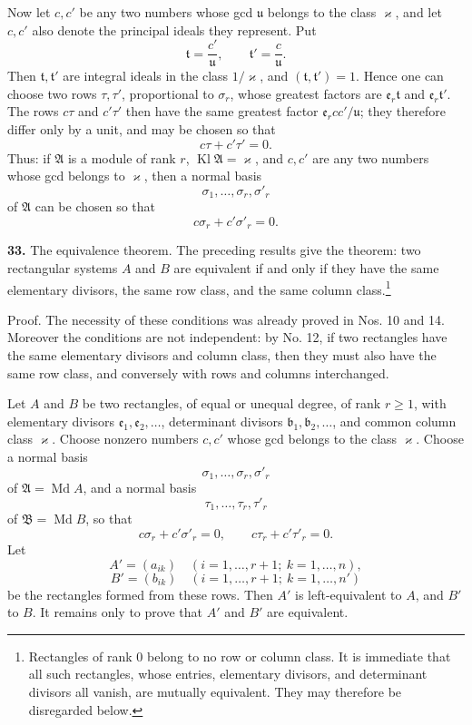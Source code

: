 \documentclass[11pt,a4paper]{article}
\newcommand{\Kl}{\operatorname{Kl}}
\begin{document}
Now let \(c,c'\) be any two numbers whose gcd \(\mathfrak u\) belongs to the class \(\varkappa\), and let \(c,c'\) also denote the principal ideals they represent. Put
\[
 \mathfrak t=\frac{c'}{\mathfrak u},\qquad
 \mathfrak t'=\frac{c}{\mathfrak u}.
\]
Then \(\mathfrak t,\mathfrak t'\) are integral ideals in the class \(1/\varkappa\), and \((\mathfrak t,\mathfrak t')=1\). Hence one can choose two rows \(\tau,\tau'\), proportional to \(\sigma_r\), whose greatest factors are \(\mathfrak e_r\mathfrak t\) and \(\mathfrak e_r\mathfrak t'\). The rows \(c\tau\) and \(c'\tau'\) then have the same greatest factor \(\mathfrak e_r cc'/\mathfrak u\); they therefore differ only by a unit, and may be chosen so that
\[
 c\tau+c'\tau'=0.
\]
Thus: if \(\mathfrak A\) is a module of rank \(r\), \(\Kl\mathfrak A=\varkappa\), and \(c,c'\) are any two numbers whose gcd belongs to \(\varkappa\), then a normal basis
\[
 \sigma_1,\ldots,\sigma_r,\sigma'_r
\]
of \(\mathfrak A\) can be chosen so that
\[
 c\sigma_r+c'\sigma'_r=0.
\]

\textbf{33.} The equivalence theorem. The preceding results give the theorem: two rectangular systems \(A\) and \(B\) are equivalent if and only if they have the same elementary divisors, the same row class, and the same column class.\footnote{Rectangles of rank \(0\) belong to no row or column class. It is immediate that all such rectangles, whose entries, elementary divisors, and determinant divisors all vanish, are mutually equivalent. They may therefore be disregarded below.}

Proof. The necessity of these conditions was already proved in Nos. 10 and 14. Moreover the conditions are not independent: by No. 12, if two rectangles have the same elementary divisors and column class, then they must also have the same row class, and conversely with rows and columns interchanged.

Let \(A\) and \(B\) be two rectangles, of equal or unequal degree, of rank \(r\ge1\), with elementary divisors \(\mathfrak e_1,\mathfrak e_2,\ldots\), determinant divisors \(\mathfrak b_1,\mathfrak b_2,\ldots\), and common column class \(\varkappa\). Choose nonzero numbers \(c,c'\) whose gcd belongs to the class \(\varkappa\). Choose a normal basis
\[
 \sigma_1,\ldots,\sigma_r,\sigma'_r
\]
of \(\mathfrak A=\operatorname{Md}A\), and a normal basis
\[
 \tau_1,\ldots,\tau_r,\tau'_r
\]
of \(\mathfrak B=\operatorname{Md}B\), so that
\[
 c\sigma_r+c'\sigma'_r=0,\qquad c\tau_r+c'\tau'_r=0. \tag{42}
\]
Let
\[
 A'=(a_{ik})\quad(i=1,\ldots,r+1;\ k=1,\ldots,n),
\]
\[
 B'=(b_{ik})\quad(i=1,\ldots,r+1;\ k=1,\ldots,n')
\]
be the rectangles formed from these rows. Then \(A'\) is left-equivalent to \(A\), and \(B'\) to \(B\). It remains only to prove that \(A'\) and \(B'\) are equivalent.
\end{document}

